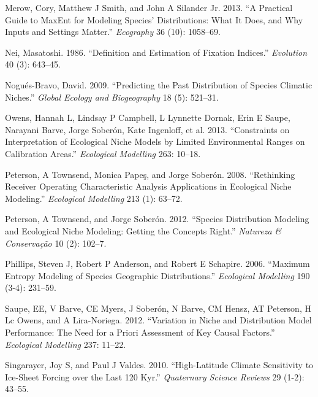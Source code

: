 \documentclass[
]{article}
\newlength{\cslhangindent}
\newlength{\cslentryspacingunit} %
\newenvironment{CSLReferences}[2] %
 {%
  \setlength{\parindent}{0pt}
  \ifodd #1
  \let\oldpar\par
  \def\par{\hangindent=\cslhangindent\oldpar}
  \fi
  \setlength{\parskip}{#2\cslentryspacingunit}
 }%
 {}
\begin{document}
\begin{CSLReferences}{1}{0}
\leavevmode{}%
Merow, Cory, Matthew J Smith, and John A Silander Jr. 2013. {``A
Practical Guide to MaxEnt for Modeling Species' Distributions: What It
Does, and Why Inputs and Settings Matter.''} \emph{Ecography} 36 (10):
1058--69.

\leavevmode{}%
Nei, Masatoshi. 1986. {``Definition and Estimation of Fixation
Indices.''} \emph{Evolution} 40 (3): 643--45.

\leavevmode{}%
Nogués-Bravo, David. 2009. {``Predicting the Past Distribution of
Species Climatic Niches.''} \emph{Global Ecology and Biogeography} 18
(5): 521--31.

\leavevmode{}%
Owens, Hannah L, Lindsay P Campbell, L Lynnette Dornak, Erin E Saupe,
Narayani Barve, Jorge Soberón, Kate Ingenloff, et al. 2013.
{``Constraints on Interpretation of Ecological Niche Models by Limited
Environmental Ranges on Calibration Areas.''} \emph{Ecological
Modelling} 263: 10--18.

\leavevmode{}%
Peterson, A Townsend, Monica Papeş, and Jorge Soberón. 2008.
{``Rethinking Receiver Operating Characteristic Analysis Applications in
Ecological Niche Modeling.''} \emph{Ecological Modelling} 213 (1):
63--72.

\leavevmode{}%
Peterson, A Townsend, and Jorge Soberón. 2012. {``Species Distribution
Modeling and Ecological Niche Modeling: Getting the Concepts Right.''}
\emph{Natureza \& Conserva{ç}{ã}o} 10 (2): 102--7.

\leavevmode{}%
Phillips, Steven J, Robert P Anderson, and Robert E Schapire. 2006.
{``Maximum Entropy Modeling of Species Geographic Distributions.''}
\emph{Ecological Modelling} 190 (3-4): 231--59.

\leavevmode{}%
Saupe, EE, V Barve, CE Myers, J Soberón, N Barve, CM Hensz, AT Peterson,
H Lc Owens, and A Lira-Noriega. 2012. {``Variation in Niche and
Distribution Model Performance: The Need for a Priori Assessment of Key
Causal Factors.''} \emph{Ecological Modelling} 237: 11--22.

\leavevmode{}%
Singarayer, Joy S, and Paul J Valdes. 2010. {``High-Latitude Climate
Sensitivity to Ice-Sheet Forcing over the Last 120 Kyr.''}
\emph{Quaternary Science Reviews} 29 (1-2): 43--55.


\end{CSLReferences}
\end{document}
